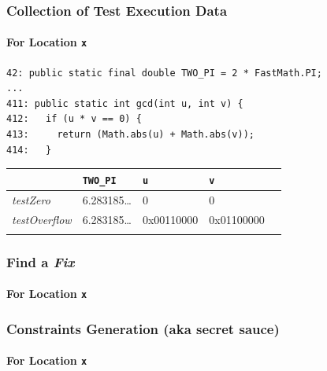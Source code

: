\documentclass[onlymath]{beamer}
\begin{document}
\begin{frame}[fragile]
  \frametitle{Collection of Test Execution Data}
  \framesubtitle{For Location \texttt{x}}
\begin{lstlisting}[basicstyle=\footnotesize]
 42: public static final double TWO_PI = 2 * FastMath.PI;
...
411: public static int gcd(int u, int v) {
412:   if (u * v == 0) {
413:     return (Math.abs(u) + Math.abs(v));
414:   }
\end{lstlisting}

\begin{center}
\begin{tabular}{|l|l|l|l|l}
\hline
 & \texttt{TWO\_PI} & \texttt{u} & \texttt{v} & \\
\hline
\textit{testZero} & 6.283185\dots & 0 & 0 & \\
\hline
\textit{testOverflow} & 6.283185\dots & 0x00110000 & 0x01100000 & \\
\hline
 & & & & \\
\end{tabular}
\end{center}
\end{frame}

\frame
{
  \frametitle{Find a \textit{Fix}}
  \framesubtitle{For Location \texttt{x}}
  \begin{center}
  
  \end{center}
}

\frame
{
  \frametitle{Constraints Generation (aka secret sauce)}
  \framesubtitle{For Location \texttt{x}}
  \begin{center}
  
  \end{center}
}
\end{document}
